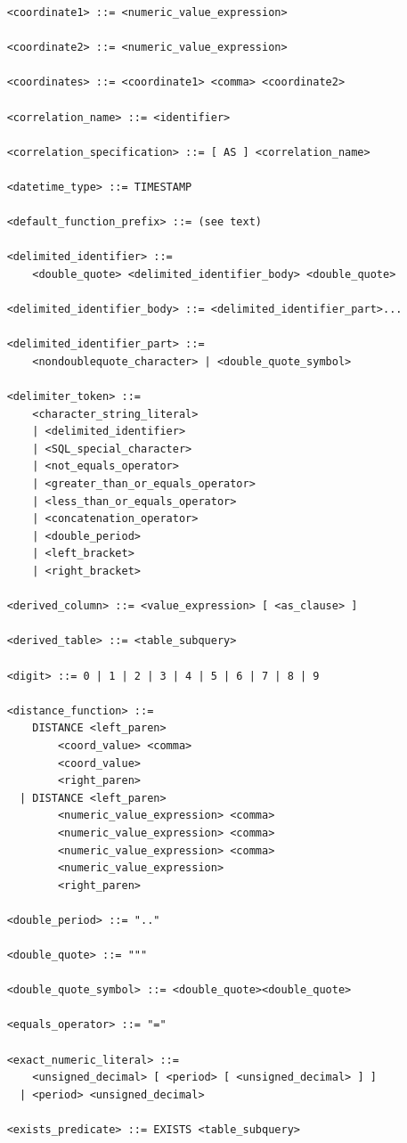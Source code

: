 \documentclass[11pt,a4paper]{ivoa}
\begin{document}
\begin{verbatim}
    <coordinate1> ::= <numeric_value_expression>

    <coordinate2> ::= <numeric_value_expression>

    <coordinates> ::= <coordinate1> <comma> <coordinate2>

    <correlation_name> ::= <identifier>

    <correlation_specification> ::= [ AS ] <correlation_name>

    <datetime_type> ::= TIMESTAMP

    <default_function_prefix> ::= (see text)

    <delimited_identifier> ::=
        <double_quote> <delimited_identifier_body> <double_quote>

    <delimited_identifier_body> ::= <delimited_identifier_part>...

    <delimited_identifier_part> ::=
        <nondoublequote_character> | <double_quote_symbol>

    <delimiter_token> ::=
        <character_string_literal>
        | <delimited_identifier>
        | <SQL_special_character>
        | <not_equals_operator>
        | <greater_than_or_equals_operator>
        | <less_than_or_equals_operator>
        | <concatenation_operator>
        | <double_period>
        | <left_bracket>
        | <right_bracket>

    <derived_column> ::= <value_expression> [ <as_clause> ]

    <derived_table> ::= <table_subquery>

    <digit> ::= 0 | 1 | 2 | 3 | 4 | 5 | 6 | 7 | 8 | 9

    <distance_function> ::=
        DISTANCE <left_paren>
            <coord_value> <comma>
            <coord_value>
            <right_paren>
      | DISTANCE <left_paren>
            <numeric_value_expression> <comma>
            <numeric_value_expression> <comma>
            <numeric_value_expression> <comma>
            <numeric_value_expression>
            <right_paren>

    <double_period> ::= ".."

    <double_quote> ::= """

    <double_quote_symbol> ::= <double_quote><double_quote>

    <equals_operator> ::= "="

    <exact_numeric_literal> ::=
        <unsigned_decimal> [ <period> [ <unsigned_decimal> ] ]
      | <period> <unsigned_decimal>

    <exists_predicate> ::= EXISTS <table_subquery>


\end{verbatim}
\end{document}
